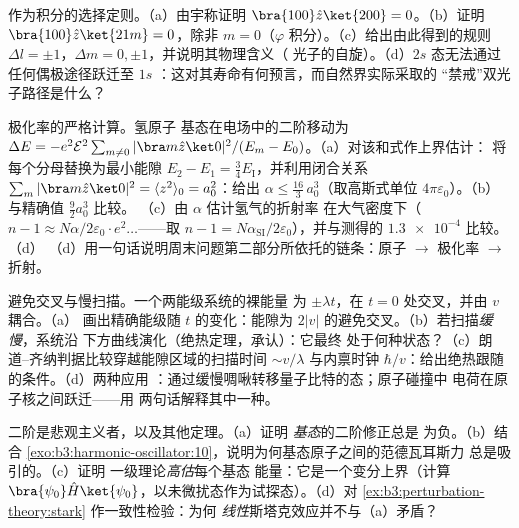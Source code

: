 \begin{exercise}[$\star\star$]\label{exo:b3:perturbation-theory:9}
作为积分的选择定则。（a）由宇称证明 $\bra{100}\hat z\ket{200} =
0$。（b）证明 $\bra{100}\hat z\ket{21m} = 0$，除非 $m =
0$（$\varphi$ 积分）。（c）给出由此得到的规则 $\Delta
l = \pm1$，$\Delta m = 0, \pm1$，并说明其物理含义（
光子的自旋）。（d）$2s$ 态无法通过任何偶极途径跃迁至 $1s$
：这对其寿命有何预言，而自然界实际采取的
“禁戒”双光子路径是什么？
\end{exercise}

\begin{exercise}[$\star\star\star$]\label{exo:b3:perturbation-theory:10}
极化率的严格计算。氢原子
基态在电场中的二阶移动为 $\Delta E = -e^2\mathcal E^2\sum_{m\neq
0}|\bra m\hat z\ket 0|^2/(E_m - E_0)$。（a）对该和式作上界估计：
将每个分母替换为最小能隙 $E_2 - E_1 =
\tfrac34 E_{\text{I}}$，并利用闭合关系 $\sum_m|\bra
m\hat z\ket0|^2 = \langle z^2\rangle_0 = a_0^2$：给出 $\alpha
\le \tfrac{16}3\,a_0^3$（取高斯式单位
$4\pi\varepsilon_0$）。（b）与精确值 $\tfrac92 a_0^3$ 比较。
（c）由 $\alpha$ 估计氢气的折射率
在大气密度下（$n - 1 \approx N\alpha/2\varepsilon_0
\cdot e^2\dots$——取 $n - 1 = N\alpha_{\text{SI}}/2
\varepsilon_0$），并与测得的 $\num{1.3e-4}$ 比较。（d）
（d）用一句话说明周末问题第二部分所依托的链条：原子 $\to$
极化率 $\to$ 折射。
\end{exercise}

\begin{exercise}[$\star\star\star$]\label{exo:b3:perturbation-theory:11}
避免交叉与慢扫描。一个两能级系统的裸能量
为 $\pm\lambda t$，在 $t = 0$ 处交叉，并由 $v$ 耦合。（a）
画出精确能级随 $t$ 的变化：能隙为
$2|v|$ 的避免交叉。（b）若扫描\emph{缓慢}，系统沿
下方曲线演化（绝热定理，承认）：它最终
处于何种状态？（c）朗道–齐纳判据比较穿越能隙区域的扫描时间
$\sim v/\lambda$ 与内禀时钟
$\hbar/v$：给出绝热跟随的条件。（d）两种应用
：通过缓慢啁啾转移量子比特的态；原子碰撞中
电荷在原子核之间跃迁——用
两句话解释其中一种。
\end{exercise}

\begin{exercise}[$\star\star\star$]\label{exo:b3:perturbation-theory:12}
二阶是悲观主义者，以及其他定理。（a）证明
\emph{基态}的二阶修正总是
为负。（b）结合
\cref{exo:b3:harmonic-oscillator:10}，说明为何基态原子之间的范德瓦耳斯力
总是吸引的。（c）证明
一级理论\emph{高估}每个基态
能量：它是一个变分上界（计算 $\bra{\psi_0}\hat
H\ket{\psi_0}$，以未微扰态作为试探态）。（d）对
\cref{ex:b3:perturbation-theory:stark} 作一致性检验：为何
\emph{线性}斯塔克效应并不与（a）矛盾？
\end{exercise}

